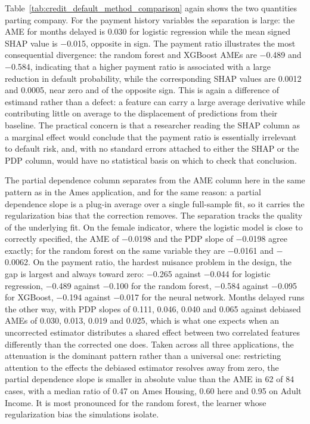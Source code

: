 \documentclass[12pt]{article}
\begin{document}
	Table~\ref{tab:credit_default_method_comparison} again shows the two quantities parting company. For the payment history variables the separation is large: the AME for months delayed is 0.030 for logistic regression while the mean signed SHAP value is $-$0.015, opposite in sign. The payment ratio illustrates the most consequential divergence: the random forest and XGBoost AMEs are $-$0.489 and $-$0.584, indicating that a higher payment ratio is associated with a large reduction in default probability, while the corresponding SHAP values are 0.0012 and 0.0005, near zero and of the opposite sign. This is again a difference of estimand rather than a defect: a feature can carry a large average derivative while contributing little on average to the displacement of predictions from their baseline. The practical concern is that a researcher reading the SHAP column as a marginal effect would conclude that the payment ratio is essentially irrelevant to default risk, and, with no standard errors attached to either the SHAP or the PDP column, would have no statistical basis on which to check that conclusion.

	The partial dependence column separates from the AME column here in the same pattern as in the Ames application, and for the same reason: a partial dependence slope is a plug-in average over a single full-sample fit, so it carries the regularization bias that the correction removes. The separation tracks the quality of the underlying fit. On the female indicator, where the logistic model is close to correctly specified, the AME of $-$0.0198 and the PDP slope of $-$0.0198 agree exactly; for the random forest on the same variable they are $-$0.0161 and $-$0.0062. On the payment ratio, the hardest nuisance problem in the design, the gap is largest and always toward zero: $-$0.265 against $-$0.044 for logistic regression, $-$0.489 against $-$0.100 for the random forest, $-$0.584 against $-$0.095 for XGBoost, $-$0.194 against $-$0.017 for the neural network. Months delayed runs the other way, with PDP slopes of 0.111, 0.046, 0.040 and 0.065 against debiased AMEs of 0.030, 0.013, 0.019 and 0.025, which is what one expects when an uncorrected estimator distributes a shared effect between two correlated features differently than the corrected one does. Taken across all three applications, the attenuation is the dominant pattern rather than a universal one: restricting attention to the effects the debiased estimator resolves away from zero, the partial dependence slope is smaller in absolute value than the AME in 62 of 84 cases, with a median ratio of 0.47 on Ames Housing, 0.60 here and 0.95 on Adult Income. It is most pronounced for the random forest, the learner whose regularization bias the simulations isolate.
	
\end{document}
